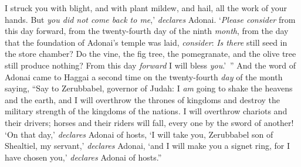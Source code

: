\begin{biblechapter}
\verse I struck you with blight, and with plant mildew, and hail, all the work of your hands. But \textit{you did not come back to me},’ \textit{declares} Adonai.
\verse ‘\textit{Please consider} from this day forward, from the twenty-fourth day of the ninth \textit{month}, from the day that the foundation of Adonai’s temple was laid, \textit{consider}:
\verse \textit{Is there} still seed in the store chamber? Do the vine, the fig tree, the pomegranate, and the olive tree still produce nothing? From this day \textit{forward} I will bless \textit{you}.’ ”
 And the word of Adonai came to Haggai a second time on the twenty-fourth \textit{day} of the month saying,
\verse “Say to Zerubbabel, governor of Judah: I \textit{am} going to shake the heavens and the earth,
\verse and I will overthrow the thrones of kingdoms and destroy the military strength of the kingdoms of the nations. I will overthrow chariots and their drivers; horses and their riders will fall, every one by the sword of another!
\verse ‘On that day,’ \textit{declares} Adonai of hosts, ‘I will take you, Zerubbabel son of Shealtiel, my servant,’ \textit{declares} Adonai, ‘and I will make you a signet ring, for I have chosen you,’ \textit{declares} Adonai of hosts.”
\end{biblechapter}

